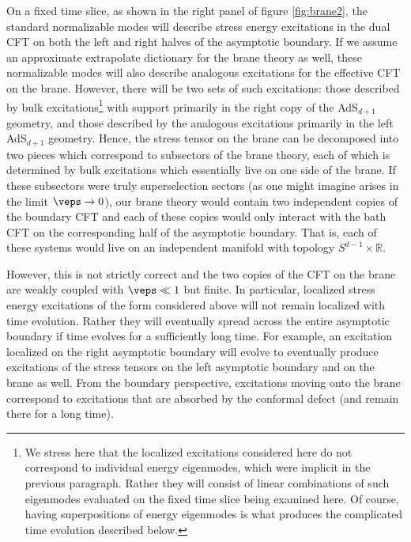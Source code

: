 On a fixed time slice, as shown in the right panel of figure \ref{fig:brane2}, the standard normalizable modes will describe stress energy excitations in the dual CFT on both the left and right halves of the asymptotic boundary. If we assume an approximate extrapolate dictionary \cite{Harlow:2011ke} for the brane theory as well, these normalizable modes will also describe analogous excitations for the effective CFT on the brane. However, there will be two sets of such excitations: those described by bulk excitations\footnote{We stress here that the localized excitations considered here do not correspond to individual energy eigenmodes, which were implicit in the previous paragraph. Rather they will consist of linear combinations of such eigenmodes evaluated on the fixed time slice being examined here. Of course, having superpositions of energy eigenmodes is what produces the complicated time evolution described below.} with support primarily in the right copy of the AdS$_{d+1}$ geometry, and those described by the analogous excitations primarily in the left AdS$_{d+1}$ geometry. Hence, the stress tensor on the brane can be decomposed into two pieces which correspond to subsectors of the brane theory, each of which is determined by bulk excitations which essentially live on one side of the brane. If these subsectors were truly superselection sectors (\eg as one might imagine arises in the limit $\veps\to0$), our brane theory would contain two independent copies of the boundary CFT  and each of these copies would only interact with the bath CFT on the corresponding half of the asymptotic boundary. That is, each of these systems would live on an independent manifold with topology $S^{d-1} \times \mathbb R$. 

However, this is not strictly correct and the two copies of the CFT on the brane are weakly coupled with $\veps\ll1$ but finite. In particular, localized stress energy excitations of the form considered above will not remain localized with time evolution. Rather they will eventually spread across the entire asymptotic boundary if time evolves for a sufficiently long time. For example, an excitation localized on the right asymptotic boundary will evolve to eventually produce excitations of the stress tensors on the left asymptotic boundary and on the brane as well. From the boundary perspective, excitations moving onto the brane correspond to excitations that are absorbed by the conformal defect (and remain there for a long time).

